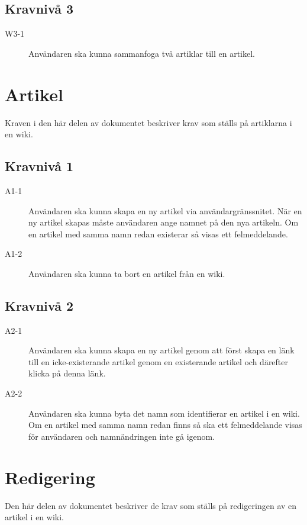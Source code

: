 \subsection{Kravnivå 3}
\begin{description}
\item[W3-1] Användaren ska kunna sammanfoga två artiklar till en artikel.
\end{description}

\section{Artikel}
Kraven i den här delen av dokumentet beskriver krav som ställs på artiklarna i en wiki.

\subsection{Kravnivå 1}
\begin{description}
\item[A1-1] Användaren ska kunna skapa en ny artikel via användargränssnitet. När en ny artikel skapas måste användaren ange namnet på den nya artikeln. Om en artikel med samma namn redan existerar så visas ett felmeddelande.
\item[A1-2] Användaren ska kunna ta bort en artikel från en wiki.
\end{description}

\subsection{Kravnivå 2}
\begin{description}
\item[A2-1] Användaren ska kunna skapa en ny artikel genom att först skapa en länk till en icke-existerande artikel genom en existerande artikel och därefter klicka på denna länk.
\item[A2-2] Användaren ska kunna byta det namn som identifierar en artikel i en wiki. Om en artikel med samma namn redan finns så ska ett felmeddelande visas för användaren och namnändringen inte gå igenom.
\end{description}

\section{Redigering}
Den här delen av dokumentet beskriver de krav som ställs på redigeringen av en artikel i en wiki.

